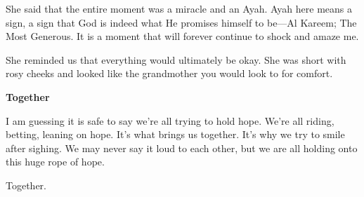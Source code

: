 \documentclass[11pt,twoside,openany]{book}
\newcommand{\piecehead}[1]{%
  \Needspace{6\baselineskip}%
  \par\addvspace{1.2\baselineskip}%
  {\noindent\large\bfseries #1\par}%
  \vspace{-0.15\baselineskip}%
}
\begin{document}
She said that the entire moment was a miracle and an Ayah. Ayah here means a sign, a sign that God is indeed what He promises himself to be---Al Kareem; The Most Generous. It is a moment that will forever continue to shock and amaze me.

She reminded us that everything would ultimately be okay. She was short with rosy cheeks and looked like the grandmother you would look to for comfort.

\piecehead{Together}
I am guessing it is safe to say we're all trying to hold hope. We're all riding, betting, leaning on hope. It's what brings us together. It's why we try to smile after sighing. We may never say it loud to each other, but we are all holding onto this huge rope of hope.

Together.
\end{document}
